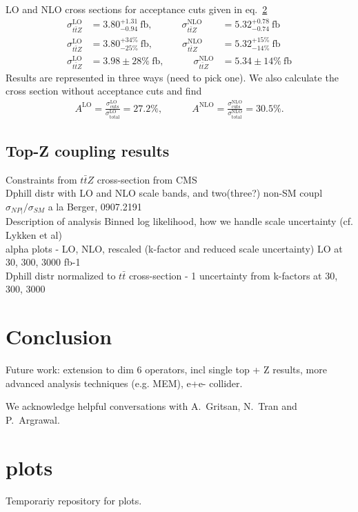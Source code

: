 \documentclass[preprint]{JHEP3} %
\def\ttb{t\bar{t}}
\newcommand{\be}{\begin{eqnarray}}
\newcommand{\ee}{\end{eqnarray}}
\begin{document}
LO and NLO cross sections for acceptance cuts given in eq.~\ref{}
\be
  \sigma_{\ttb Z}^\mathrm{LO} &= 3.80^{+1.31}_{-0.94}~\mathrm{fb},
  \quad\quad\quad
  \sigma_{\ttb Z}^\mathrm{NLO} &= 5.32^{+0.78}_{-0.74}~\mathrm{fb}
\\
% 
  \sigma_{\ttb Z}^\mathrm{LO} &= 3.80^{+34\%}_{-25\%}~\mathrm{fb},
  \quad\quad\quad
  \sigma_{\ttb Z}^\mathrm{NLO} &= 5.32^{+15\%}_{-14\%}~\mathrm{fb}
\\
% 
  \sigma_{\ttb Z}^\mathrm{LO} &= 3.98 \pm 28\% ~\mathrm{fb},
  \quad\quad\quad
  \sigma_{\ttb Z}^\mathrm{NLO} &= 5.34 \pm 14 \%~\mathrm{fb}
\ee
Results are represented in three ways (need to pick one).
We also calculate the cross section without acceptance cuts and find
\be
  A^\mathrm{LO} = \frac{\sigma_{\mathrm{cuts}}^\mathrm{LO}}{\sigma_{\mathrm{total}}^\mathrm{LO}} = 27.2 \% ,
  \quad\quad\quad
  A^\mathrm{NLO} = \frac{\sigma_{\mathrm{cuts}}^\mathrm{NLO}}{\sigma_{\mathrm{total}}^\mathrm{NLO}} = 30.5 \%.
\ee

\subsection{Top-Z coupling results}
Constraints from $t\bar{t}Z$ cross-section from CMS \\
Dphill distr with LO and NLO scale bands, and two(three?) non-SM coupl\\
$\sigma_{NP|} / \sigma_{SM}$ a la Berger, 0907.2191 \\
Description of analysis Binned log likelihood, how we handle scale uncertainty (cf. Lykken et al) \\
alpha plots - LO, NLO, rescaled (k-factor and reduced scale uncertainty) LO at 30, 300, 3000 fb-1\\
Dphill distr normalized to $t\bar{t}$ cross-section  - 1 uncertainty from k-factors at 30, 300, 3000\\

\section{Conclusion}
Future work: extension to dim 6 operators, incl single top + Z results, more advanced analysis techniques (e.g. MEM), e+e- collider.
%


\acknowledgments
We acknowledge helpful conversations with A.~Gritsan, N.~Tran and P.~Argrawal. 



\appendix
\section{plots}
Temporariy repository for plots.
\end{document}
